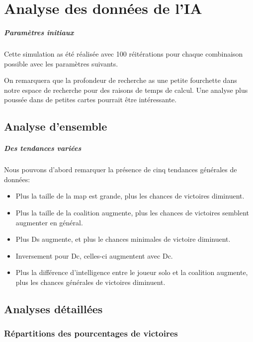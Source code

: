 \chapter{Analyse des données de l'IA}

\paragraph{Paramètres initiaux}
Cette simulation as été réalisée avec 100 réitérations pour chaque combinaison possible avec les paramètres suivants.

\begin{info}
	On remarquera que la profondeur de recherche as une petite fourchette dans notre espace de recherche pour des raisons de temps de calcul. Une analyse plus poussée dans de petites cartes pourrait être intéressante.
\end{info}

\section{Analyse d'ensemble}
\paragraph{Des tendances variées}
Nous pouvons d'abord remarquer la présence de cinq tendances générales de données:
\begin{itemize}
	\item Plus la taille de la map est grande, plus les chances de victoires diminuent.
	\item Plus la taille de la coalition augmente, plus les chances de victoires semblent augmenter en général.
	\item Plus Ds augmente, et plus le chances minimales de victoire diminuent.
	\item Inversement pour Dc, celles-ci augmentent avec Dc.
	\item Plus la différence d'intelligence entre le joueur solo et la coalition augmente, plus les chances générales de victoires diminuent.
\end{itemize}



\section{Analyses détaillées}
\subsection{Répartitions des pourcentages de victoires}
